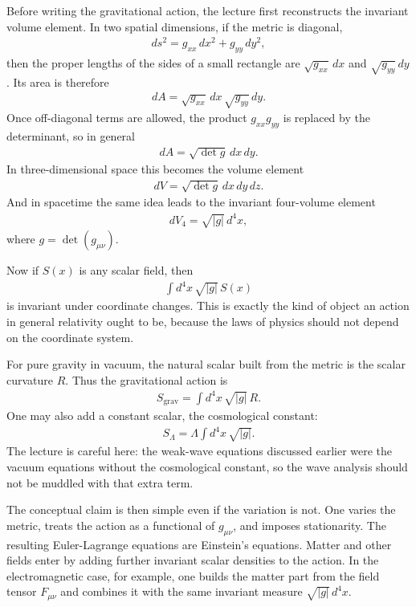 Before writing the gravitational action, the lecture first reconstructs the invariant volume element. In two spatial dimensions, if the metric is diagonal,
\begin{align}
ds^{2}=g_{xx}\,dx^{2}+g_{yy}\,dy^{2},
\end{align}
then the proper lengths of the sides of a small rectangle are \(\sqrt{g_{xx}}\,dx\) and \(\sqrt{g_{yy}}\,dy\). Its area is therefore
\begin{align}
dA=\sqrt{g_{xx}}\,dx\,\sqrt{g_{yy}}\,dy.
\end{align}
Once off-diagonal terms are allowed, the product \(g_{xx}g_{yy}\) is replaced by the determinant, so in general
\begin{align}
dA=\sqrt{\det g}\,dx\,dy.
\end{align}
In three-dimensional space this becomes the volume element
\begin{align}
dV=\sqrt{\det g}\,dx\,dy\,dz.
\end{align}
And in spacetime the same idea leads to the invariant four-volume element
\begin{align}
dV_{4}=\sqrt{|g|}\,d^{4}x,
\end{align}
where \(g=\det(g_{\mu\nu})\).

Now if \(S(x)\) is any scalar field, then
\begin{align}
\int d^{4}x\,\sqrt{|g|}\,S(x)
\end{align}
is invariant under coordinate changes. This is exactly the kind of object an action in general relativity ought to be, because the laws of physics should not depend on the coordinate system.

For pure gravity in vacuum, the natural scalar built from the metric is the scalar curvature \(R\). Thus the gravitational action is
\begin{align}
S_{\mathrm{grav}}=\int d^{4}x\,\sqrt{|g|}\,R.
\end{align}
One may also add a constant scalar, the cosmological constant:
\begin{align}
S_{\Lambda}=\Lambda\int d^{4}x\,\sqrt{|g|}.
\end{align}
The lecture is careful here: the weak-wave equations discussed earlier were the vacuum equations without the cosmological constant, so the wave analysis should not be muddled with that extra term.

The conceptual claim is then simple even if the variation is not. One varies the metric, treats the action as a functional of \(g_{\mu\nu}\), and imposes stationarity. The resulting Euler-Lagrange equations are Einstein's equations. Matter and other fields enter by adding further invariant scalar densities to the action. In the electromagnetic case, for example, one builds the matter part from the field tensor \(F_{\mu\nu}\) and combines it with the same invariant measure \(\sqrt{|g|}\,d^{4}x\).

